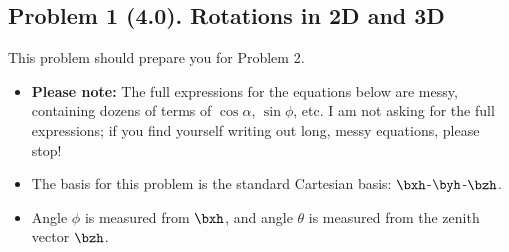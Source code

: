 \documentclass[11pt,titlepage,fleqn]{article}
\newcommand{\rotangA}{\alpha}
\begin{document}

\pagebreak
\subsection*{Problem 1 (4.0). Rotations in 2D and 3D}

This problem should prepare you for Problem 2.
%
\begin{itemize}
\item {\bf Please note:} The full expressions for the equations below are messy, containing dozens of terms of $\cos\rotangA$, $\sin\phi$, etc. I am not asking for the full expressions; if you find yourself writing out long, messy equations, please stop!
\item The basis for this problem is the standard Cartesian basis: $\bxh$-$\byh$-$\bzh$.
\item Angle $\phi$ is measured from $\bxh$, and angle $\theta$ is measured from the zenith vector $\bzh$.
\end{itemize}
\end{document}
